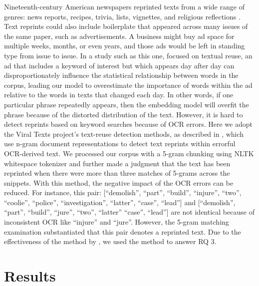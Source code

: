 \documentclass[11pt]{article}
\begin{document}
Nineteenth-century American newspapers reprinted texts 
from a wide range of genres: news reports, recipes, trivia, lists, vignettes, 
and religious reflections \citep{cordell2017fugitive}. 
Text reprints could also include boilerplate that appeared across many issues of the same paper, 
such as advertisements. 
A business might buy ad space for multiple weeks, months, or even years, 
and those ads would be left 
in standing type from issue to issue. In a study such as this one, focused on textual reuse,
an ad that includes a keyword of interest 
but which appears day after day can disproportionately influence the statistical 
relationship between words in the corpus, 
leading our model to overestimate the importance of words within the ad relative
to the words in texts that changed each day. 
In other words, if one particular phrase repeatedly appears, then the 
embedding model will overfit the phrase because of 
the distorted distribution of the text. However, it is hard to detect reprints based on keyword searches because of OCR errors. 
Here we adopt the Viral Texts project's text-reuse detection methods, as described in \citet{smith2014detecting} , which use n-gram document representations 
to detect text reprints 
within errorful OCR-derived text. We processed our corpus with a 5-gram chunking 
using NLTK whitespace tokenizer and further made a judgment 
that the text has been reprinted when there were more than 
three matches of 5-grams across the snippets. 
With this method, the negative impact of the OCR errors can be reduced.
For instance, this pair: [``demolish'', ``part'', ``build'', ``injure'', ``two'', ``coolie'', ``police'', ``investigation'', 
``latter'', ``case'', ``lead''] and [``demolish'', ``part'', ``build'', ``jure'', ``two'', ``latter'' 
``case'', ``lead''] are not identical because of inconsistent OCR like ``injure'' and ``jure''.
However, the 5-gram matching examination substantiated that this pair denotes a reprinted text. 
Due to the effectiveness of the method by \citet{smith2014detecting}, 
we used the method to answer RQ 3.

\section{Results} \label{sec:results}
\end{document}
